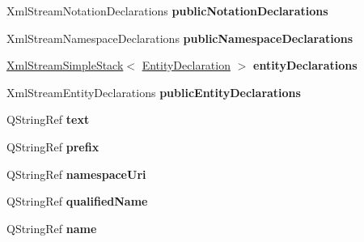 \begin{DoxyCompactItemize}
\item 
\mbox{\label{class_xml_stream_reader_private_ace07520fd67938bb9a741b22da6316d4}} 
Xml\+Stream\+Notation\+Declarations {\bfseries public\+Notation\+Declarations}
\item 
\mbox{\label{class_xml_stream_reader_private_a74a2d0e10fac7f43d91ab014c38b3f82}} 
Xml\+Stream\+Namespace\+Declarations {\bfseries public\+Namespace\+Declarations}
\item 
\mbox{\label{class_xml_stream_reader_private_a4668cf3d6cb96c7d85ebc069ce7e324d}} 
\hyperlink{class_xml_stream_simple_stack}{Xml\+Stream\+Simple\+Stack}$<$ \hyperlink{struct_xml_stream_reader_private_1_1_entity_declaration}{Entity\+Declaration} $>$ {\bfseries entity\+Declarations}
\item 
\mbox{\label{class_xml_stream_reader_private_a2d35b67c07fe2e8d82492451250cc5cd}} 
Xml\+Stream\+Entity\+Declarations {\bfseries public\+Entity\+Declarations}
\item 
\mbox{\label{class_xml_stream_reader_private_ad5cab0ea1ad080ca873428724bc0aa3a}} 
Q\+String\+Ref {\bfseries text}
\item 
\mbox{\label{class_xml_stream_reader_private_a3f24cc3181a98f96ebf11a1d39255583}} 
Q\+String\+Ref {\bfseries prefix}
\item 
\mbox{\label{class_xml_stream_reader_private_aa4a0ab816d8600a3698633f45ff436f5}} 
Q\+String\+Ref {\bfseries namespace\+Uri}
\item 
\mbox{\label{class_xml_stream_reader_private_ab48e933146002dc5e0a97cb063e0e022}} 
Q\+String\+Ref {\bfseries qualified\+Name}
\item 
\mbox{\label{class_xml_stream_reader_private_aea07e6ef40531294b1b6cc190258e8db}} 
Q\+String\+Ref {\bfseries name}
\item 
\mbox{\label{class_xml_stream_reader_private_ad47ceb1b5a8b5487dfc19af3792afe57}} 

\end{DoxyCompactItemize}
